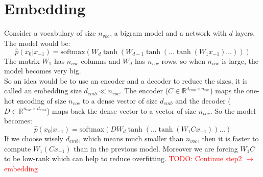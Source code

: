 \documentclass[12pt, openany]{report}
\newcommand{\R}{\mathbb{R}}
\theoremstyle{definition}
\begin{document}
\section{Embedding}
Consider a vocabulary of size $n_{voc}$, a bigram model and a network with $d$ layers. The model would be:
\begin{equation}
  \hat{p}(x_0 | x_{-1}) = \text{softmax}(W_d \tanh(W_{d-1} \tanh(... \tanh(W_1 x_{-1}) ... )))
\end{equation}
The matrix $W_1$ has $n_{voc}$ columns and $W_d$ has $n_{voc}$ rows, so when $n_{voc}$ is large, the model becomes very big.\\
So an idea would be to use an encoder and a decoder to reduce the sizes, it is called an embedding size $d_{emb} \ll n_{voc}$. The encoder ($C \in \R^{d_{emb} \times n_{voc}}$) maps the one-hot encoding of size $n_{voc}$ to a dense vector of size $d_{emb}$ and the decoder ($D \in \R^{n_{voc} \times d_{emb}}$) maps back the dense vector to a vector of size $n_{voc}$. So the model becomes:
\begin{equation}
  \hat{p}(x_0 | x_{-1}) = \text{softmax}(D W_d \tanh(... \tanh(W_1 C x_{-1})) ... )
\end{equation}
If we choose wisely $d_{emb}$, which means much smaller than $n_{voc}$, then it is faster to compute $W_1(C x_{-1})$ than in the previous model. Moreover we are forcing $W_1C$ to be low-rank which can help to reduce overfitting. \textcolor{red}{TODO: Continue step2 $\to$ embedding}
\end{document}
